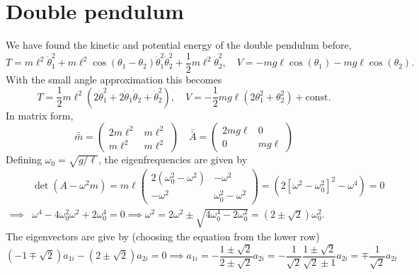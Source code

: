 \documentclass{article}
\begin{document}
    \section{Double pendulum}
    We have found the kinetic and potential energy of the double pendulum before,
    \begin{equation*}
        T = m\ell^2\dot \theta_1^2 + m \ell^2 \cos(\theta_1 - \theta_2)\dot \theta_1^2 \dot \theta_2^2 + \frac{1}{2}m \ell^2 \dot \theta_2^2, \quad
        V = -mg\ell \cos(\theta_1) - mg \ell \cos(\theta_2).
    \end{equation*}
    With the small angle approximation this becomes
    \begin{equation*}
        T = \frac{1}{2}m\ell^2\left(2\dot \theta_1^2 + 2\dot \theta_1 \dot \theta_2 + \dot \theta^2_2 \right), \quad
        V = -\frac{1}{2}mg \ell \left(2\theta_1^2 + \theta_2^2\right) + \mathrm{const.}
    \end{equation*}
    In matrix form, 
    \begin{equation*}
        \bar {\bar m} = 
        \begin{pmatrix*}
            2m \ell^2 & m \ell^2 \\
            m \ell^2 & m \ell^2
        \end{pmatrix*}
        \quad
        \bar {\bar A} = 
        \begin{pmatrix*}
            2mg\ell & 0 \\
            0 & mg\ell
        \end{pmatrix*}
    \end{equation*}
    Defining $\omega_0 = \sqrt{g/\ell}$, the eigenfrequencies are given by
    \begin{align*}
        & \det(A - \omega^2 m) = m \ell
        \begin{pmatrix*}
            2(\omega_0^2 -\omega^2 ) & -\omega^2 \\
            -\omega^2 & \omega_0^2 - \omega^2
        \end{pmatrix*}
        = (2[\omega^2 - \omega_0^2]^2 - \omega^4) = 0 \\
        \implies & \omega^4 - 4 \omega_0^2 \omega^2 + 2\omega_0^4 = 0 \implies \omega^2 = 2\omega^2 \pm \sqrt{4\omega_0^4 - 2\omega_0^2} = \left(2 \pm \sqrt 2\right) \omega_0^2.
    \end{align*}
    The eigenvectors are give by (choosing the equation from the lower row)
    \begin{equation*}
        (-1 \mp \sqrt 2) a_{1i} - (2 \pm \sqrt 2)a_{2i} = 0 \implies a_{1i} = -\frac{1 \pm \sqrt 2}{2 \pm \sqrt 2} a_{2i} =  -\frac{1}{\sqrt 2}\frac{1 \pm \sqrt 2}{\sqrt 2 \pm 1} a_{2i} = \mp \frac{1}{\sqrt 2} a_{2i}
    \end{equation*}
\end{document}
